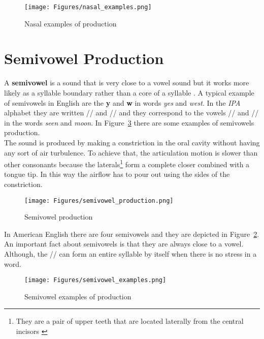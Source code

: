 \begin{figure}[!ht]
    \centering
    \texttt{[image: Figures/nasal\_examples.png]}
    \caption{Nasal examples of production \cite{mit_phonetics}}
    \label{fig:nsal_ex}
\end{figure}


\section{Semivowel Production}
\label{sec:Semivowels Production}
A \textbf{semivowel} is a sound that is very close to a vowel sound but it works more likely as a syllable boundary rather than a core of a syllable \cite{ladefoged1998sounds}. A typical example of semivowels in English are the \textbf{y} and \textbf{w} in words \textit{yes} and \textit{west}. In the \textit{IPA} alphabet they are written // and // and they correspond to the vowels // and // in the words \textit{seen} and \textit{moon}. In Figure~\ref{fig:semivowel_ex} there are some examples of semivowels production. \\
\noindent The sound is produced by making a constriction in the oral cavity without having any sort of air turbulence. To achieve that, the articulation motion is slower than other consonants because the laterals\footnote{They are a pair of upper teeth that are located laterally from the central incisors \cite{laterals_wiki}} form a complete closer combined with a tongue tip. In this way the airflow has to pour out using the sides of the constriction.

\begin{figure}[!ht]
    \centering
    \texttt{[image: Figures/semivowel\_production.png]}
    \caption{Semivowel production \cite{mit_phonetics}}
    \label{fig:semivowel_prod}
\end{figure}

\noindent In American English there are four semivowels and they are depicted in Figure~\ref{fig:semivowel_prod}. An important fact about semivowels is that they are always close to a vowel. Although, the // can form an entire syllable by itself when there is no stress in a word.

\begin{figure}[!ht]
    \centering
    \texttt{[image: Figures/semivowel\_examples.png]}
    \caption{Semivowel examples of production \cite{mit_phonetics}}
    \label{fig:semivowel_ex}
\end{figure}

